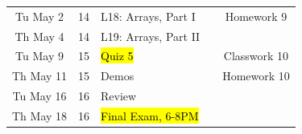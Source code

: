 \documentclass[letter,11pt]{article}
\begin{document}
\begin{tabular}{c c l l c}
Tu May 2 & 14 & L18: Arrays, Part I & & Homework 9 \\
Th May 4 & 14 & L19: Arrays, Part II  &  &  \\
Tu May 9 & 15 & \hl{Quiz 5} & & Classwork 10 \\
Th May 11 & 15 & Demos &  & Homework 10 \\
Tu May 16 & 16 & Review & \\
Th May 18 & 16 & \hl{Final Exam, 6-8PM} & \\
\end{tabular}



\end{document}
